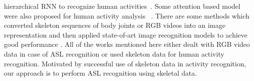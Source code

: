 \documentclass[10pt,twocolumn,letterpaper]{article}
\begin{document}
hierarchical RNN to recognize human activities~\cite{7298714}. Some attention based model were also proposed for human activity analysis ~\cite{8226767, song2016end}. There are some methods which converted skeleton sequences of body joints or RGB videos into an image representation and then applied state-of-art image recognition models to achieve good performance \cite{DBLP:conf/cvpr/KeBASB17, DBLP:journals/corr/abs-1711-05941}. All of the works mentioned here either dealt with RGB video data in case of ASL recognition or used skeleton data for human activity recognition. Motivated by successful use of skeleton data in activity recognition, our approach is to perform ASL recognition using skeletal data.  

%
%
%
%
%
\end{document}
